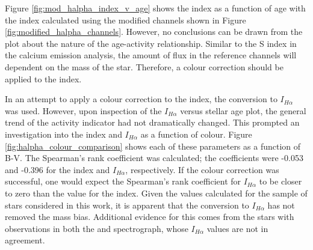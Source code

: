 Figure \ref{fig:mod_halpha_index_v_age} shows the \Halpha index as a function of age with the \Halpha index calculated using the modified channels shown in Figure \ref{fig:modified_halpha_channels}. However, no conclusions can be drawn from the plot about the nature of the age-activity relationship. Similar to the S index in the calcium emission analysis, the amount of flux in the reference channels will dependent on the mass of the star. Therefore, a colour correction should be applied to the \Halpha index.

In an attempt to apply a colour correction to the \Halpha index, the conversion to $I_{H\alpha}$ \citep{Gomes_da_Silva_etal_2014} was used. However, upon inspection of the $I_{H\alpha}$ versus stellar age plot, the general trend of the activity indicator had not dramatically changed. This prompted an investigation into the \Halpha index and $I_{H\alpha}$ as a function of colour. Figure \ref{fig:halpha_colour_comparison} shows each of these parameters as a function of B-V. The Spearman's rank coefficient was calculated; the coefficients were -0.053 and -0.396 for the \Halpha index and $I_{H\alpha}$, respectively. If the colour correction was successful, one would expect the Spearman's rank coefficient for $I_{H\alpha}$ to be closer to zero than the value for the \Halpha index. Given the values calculated for the sample of stars considered in this work, it is apparent that the conversion to $I_{H\alpha}$ has not removed the mass bias. Additional evidence for this comes from the stars with observations in both the \esp and \narval spectrograph, whose $I_{H\alpha}$ values are not in agreement.

